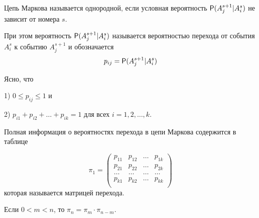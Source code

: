 \begin{definition}
Цепь Маркова называется однородной, если условная вероятность $\P(A^{s+1}_j|A^s_i)$ не зависит от номера $s$.

При этом вероятность $\P(A^{s+1}_j|A^s_i)$ называется вероятностью перехода от события $A^s_i$ к событию $A^{s+1}_j$ и обозначается
$$p_{ij} = \P(A^{s+1}_j|A^s_i)$$
\end{definition}

\begin{zam}
Ясно, что

1) $0 \leq p_{ij} \leq 1$ и

2) $p_{i1} + p_{i2} + \ldots + p_{ik} = 1$ для всех $i = 1, 2, \ldots , k.$
\end{zam}

\begin{definition}
Полная информация о вероятностях перехода в цепи Маркова содержится в таблице

$$\pi_1 = \begin{pmatrix} 
p_{11} & p_{12} & \ldots & p_{1k}\\
p_{21} & p_{22} & \ldots & p_{2k}\\
\ldots & \ldots & \ldots & \ldots\\
p_{k1} & p_{k2} & \ldots & p_{kk}\\
\end{pmatrix}
$$
которая называется матрицей перехода.
\end{definition}


\begin{theorem}
	Если $0 < m < n$, то $\pi_n = \pi_m \cdot \pi_{n−m} .$
\end{theorem}

